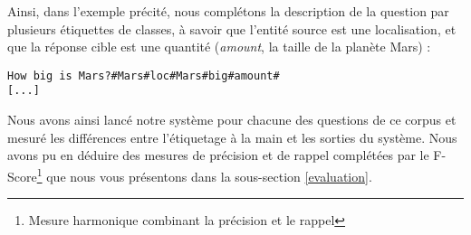 \documentclass[10pt,a4paper]{article}
\begin{document}
\par Ainsi, dans l'exemple précité, nous complétons la description de la question par plusieurs étiquettes de classes, à savoir que l'entité source est une localisation, et que la réponse cible est une quantité (\emph{amount}, la taille de la planète Mars) :

\begin{verbatim}
How big is Mars?#Mars#loc#Mars#big#amount#
[...]
\end{verbatim}


\par Nous avons ainsi lancé notre système pour chacune des questions de ce corpus et mesuré les différences entre l'étiquetage \og{}à la main\fg{} et les sorties du système. Nous avons pu en déduire des mesures de précision et de rappel complétées par le F-Score\footnote{Mesure harmonique combinant la précision et le rappel} que nous vous présentons dans la sous-section \ref{evaluation}.




\end{document}
